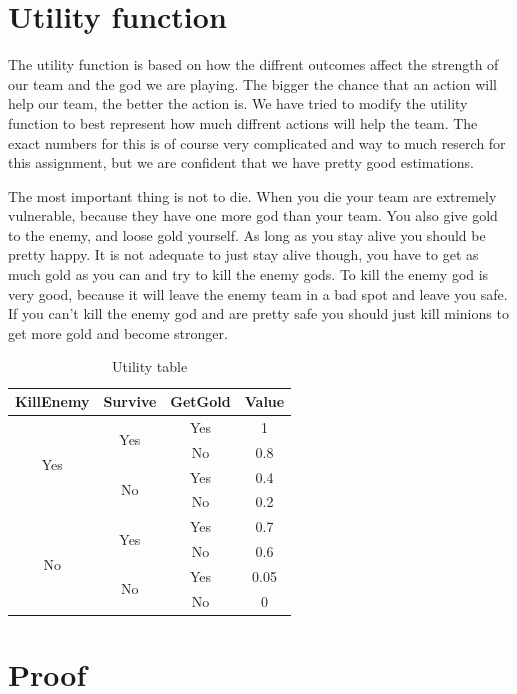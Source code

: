 \documentclass[titlepage]{article}
\begin{document}
\newpage

\section{Utility function}The utility function is based on how the diffrent outcomes affect the strength of our team and the god we are playing. The bigger the chance that an action will help our team, the better the action is. We have tried to modify the utility function to best represent how much diffrent actions will help the team. The exact numbers for this is of course very complicated and way to much reserch for this assignment, but we are confident that we have pretty good estimations. 

The most important thing is not to die. When you die your team are extremely vulnerable, because they have one more god than your team. You also give gold to the enemy, and loose gold yourself. As long as you stay alive you should be pretty happy. It is not adequate to just stay alive though, you have to get as much gold as you can and try to kill the enemy gods. To kill the enemy god is very good, because it will leave the enemy team in a bad spot and leave you safe. If you can't kill the enemy god and are pretty safe you should just kill minions to get more gold and become stronger.

\begin{table}[H]
\centering
\begin{tabular}{ |c|c|c|c| }

\hline
KillEnemy & Survive & GetGold & Value \\ \hline
\multirow{4}{*}{Yes} & \multirow{2}{*}{Yes} & Yes & 1 \\ \cline{3-4}
 & & No & 0.8 \\ \cline{2-4}
 & \multirow{2}{*}{No} & Yes & 0.4 \\ \cline{3-4}
 & & No & 0.2 \\ \hline

 \multirow{4}{*}{No} & \multirow{2}{*}{Yes} & Yes & 0.7 \\ \cline{3-4}
 & & No & 0.6 \\ \cline{2-4}
 & \multirow{2}{*}{No} & Yes & 0.05 \\ \cline{3-4}
 & & No & 0 \\ \hline
\end{tabular}
\caption{Utility table}
\end{table}


\section{Proof}
\end{document}
